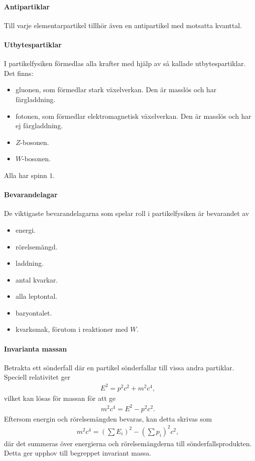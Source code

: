 \paragraph{Antipartiklar}
Till varje elementarpartikel tillhör även en antipartikel med motsatta kvanttal.

\paragraph{Utbytespartiklar}
I partikelfysiken förmedlas alla krafter med hjälp av så kallade utbytespartiklar. Det finns:
\begin{itemize}
	\item gluonen, som förmedlar stark växelverkan. Den är masslös och har färgladdning.
	\item fotonen, som förmedlar elektromagnetisk växelverkan. Den är masslös och har ej färgladdning.
	\item $Z$-bosonen.
	\item $W$-bosonen.
\end{itemize}
Alla har spinn $1$.

\paragraph{Bevarandelagar}
De viktigaste bevarandelagarna som spelar roll i partikelfysiken är bevarandet av
\begin{itemize}
	\item energi.
	\item rörelsemängd.
	\item laddning.
	\item antal kvarkar.
	\item alla leptontal.
	\item baryontalet.
	\item kvarksmak, förutom i reaktioner med $W$.
\end{itemize}

\paragraph{Invarianta massan}
Betrakta ett sönderfall där en partikel sönderfallar till vissa andra partiklar. Speciell relativitet ger
\begin{align*}
	E^{2} = p^{2}c^{2} + m^{2}c^{4},
\end{align*}
vilket kan lösas för massan för att ge
\begin{align*}
	m^{2}c^{4} = E^{2} - p^{2}c^{2}.
\end{align*}
Eftersom energin och rörelsemängden bevaras, kan detta skrivas som
\begin{align*}
	m^{2}c^{4} = \left(\sum E_{i}\right)^{2} - \left(\sum p_{i}\right)^{2}c^{2},
\end{align*}
där det summeras över energierna och rörelsemängderna till sönderfallsprodukten. Detta ger upphov till begreppet invariant massa.